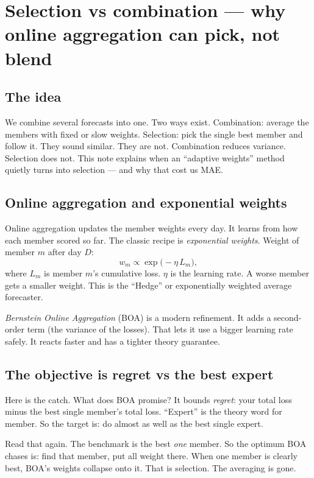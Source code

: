 \section{Selection vs combination --- why online aggregation can pick, not blend}

\subsection{The idea}

We combine several forecasts into one. Two ways exist.
Combination: average the members with fixed or slow weights.
Selection: pick the single best member and follow it.
They sound similar. They are not.
Combination reduces variance. Selection does not.
This note explains when an ``adaptive weights'' method quietly
turns into selection --- and why that cost us MAE.

\subsection{Online aggregation and exponential weights}

Online aggregation updates the member weights every day.
It learns from how each member scored so far.
The classic recipe is \emph{exponential weights}.
Weight of member $m$ after day $D$:
\[
w_m \propto \exp\!\big(-\eta \, L_m\big),
\]
where $L_m$ is member $m$'s cumulative loss.
$\eta$ is the learning rate. A worse member gets a smaller weight.
This is the ``Hedge'' or exponentially weighted average forecaster.

\emph{Bernstein Online Aggregation} (BOA) is a modern refinement.
It adds a second-order term (the variance of the losses).
That lets it use a bigger learning rate safely.
It reacts faster and has a tighter theory guarantee.

\subsection{The objective is regret vs the best expert}

Here is the catch. What does BOA promise?
It bounds \emph{regret}: your total loss minus the best single
member's total loss. ``Expert'' is the theory word for member.
So the target is: do almost as well as the best single expert.

Read that again. The benchmark is the best \emph{one} member.
So the optimum BOA chases is: find that member, put all weight there.
When one member is clearly best, BOA's weights collapse onto it.
That is selection. The averaging is gone.

